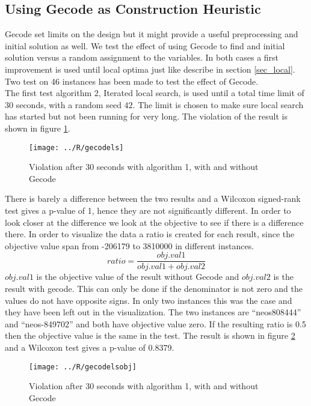 \subsection{Using Gecode as Construction Heuristic}
Gecode set limits on the design but it might provide a useful preprocessing and initial solution as well. We test 
the effect of using Gecode to find and initial solution versus a random assignment to the variables. In both cases a 
first improvement is used until local optima just like describe in section \ref{sec_local}. Two test on 46 instances 
has been made to test the effect of Gecode. \\ 
The first test algorithm 2, Iterated local search, is used until a total time limit of 30 seconds, with a random seed 
$42$. The limit is chosen to make sure local search has started but not been running for very long. The violation of 
the result is shown in figure \ref{fig_gecodels}. 
\begin{figure}[!h]
\centering
\texttt{[image: ../R/gecodels]} \caption{Violation after 30 seconds with 
algorithm 1, with and without Gecode}\label{fig_gecodels}
\end{figure}\noindent
There is barely a difference between the two results and a Wilcoxon signed-rank test gives a p-value of 1, hence they 
are not significantly different. In order to look closer at the difference we look at the objective to see if there is 
a difference there. In order to visualize the data a ratio is created for each result, since the objective value span
from -206179 to 3810000 in different instances. 
\begin{equation}
 ratio = \frac{obj.val1}{obj.val1+obj.val2}
\end{equation}
$obj.val1$ is the objective value of the result without Gecode and $obj.val2$ is the result with gecode. This can only 
be done if the denominator is not zero and the values do not have opposite signs. In only two instances this was the 
case and they have been left out in the visualization. The two instances are ``neos808444'' and ``neos-849702'' and 
both have objective value zero. If the resulting ratio is 0.5 then the objective value is the same in the test. The 
result is shown in figure \ref{fig_gecodelsobj} and a Wilcoxon test gives a p-value of 0.8379. 
\begin{figure}[!h]
\centering
\texttt{[image: ../R/gecodelsobj]} \caption{Violation after 30 seconds with 
algorithm 1, with and without Gecode}\label{fig_gecodelsobj}
\end{figure}\noindent
